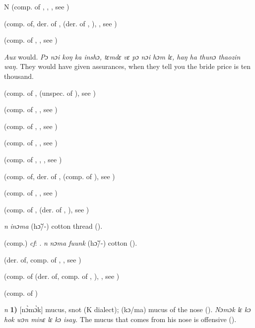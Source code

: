 \begin{letter}{N}
 (comp. of , , , see ) 

 (comp. of, der. of ,  (der. of , ), , see ) 

 (comp. of , , see ) 

 \textit{Aux} would. \textit{Pɔ nɔi koŋ ka inshɔ, tɛmdɛ vɛ pɔ nɔi hɔm lɛ, haŋ ha thunɔ thaozin waŋ.} They would have given assurances, when they tell you the bride price is ten thousand.

 (comp. of ,  (unspec. of ), see ) 

 (comp. of , , see ) 

 (comp. of , , see ) 

 (comp. of , , see ) 

 (comp. of , , , see ) 

 (comp. of, der. of ,  (comp. of ), see ) 

 (comp. of , , see ) 

 (comp. of ,  (der. of , ), see ) 


 \textit{n} \textit{inɔma} (hɔ̃/-) cotton thread (\citealt{Pichl1967}). 

 (comp.) \textit{cf}: . \textit{n} \textit{nɔma fuunk} (hɔ̃/-) cotton (\citealt{Pichl1967}).

 (der. of, comp. of , , see )

 (comp. of  (der. of, comp. of , ), , see ) 

 (comp. of )

 \textit{n} \textbf{1)} [nɔ̀mɔ̀k] mucus, snot (K dialect); (kɔ/ma) mucus of the nose (\citealt{Pichl1967}). \textit{Nɔmɔk lɛ kɔ hok wɔn minɛ lɛ kɔ isay.} The mucus that comes from his nose is offensive (\citealt{Pichl1967}).


\end{letter}
